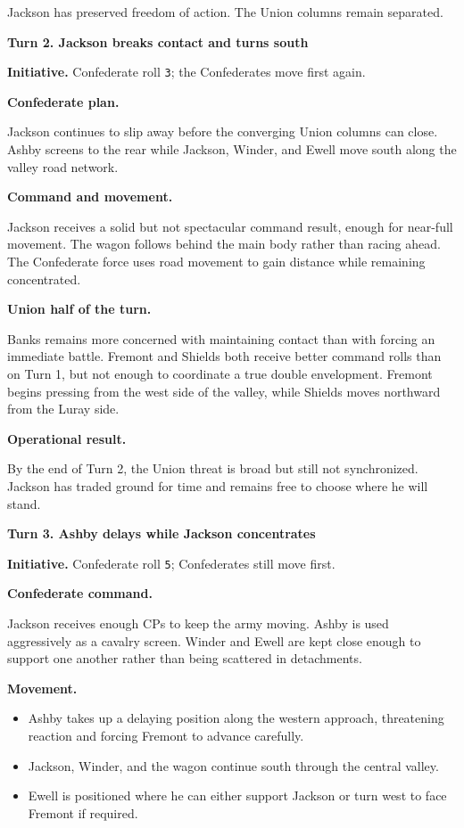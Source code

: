 \documentclass[11pt]{article}
\begin{document}
Jackson has preserved freedom of action. The Union columns remain separated.

\textbf{Turn 2. Jackson breaks contact and turns south}

\textbf{Initiative.} Confederate roll \texttt{3}; the Confederates move first again.

\textbf{Confederate plan.}

Jackson continues to slip away before the converging Union columns can close. Ashby screens to the rear while Jackson, Winder, and Ewell move south along the valley road network.

\textbf{Command and movement.}

Jackson receives a solid but not spectacular command result, enough for near-full movement. The wagon follows behind the main body rather than racing ahead. The Confederate force uses road movement to gain distance while remaining concentrated.

\textbf{Union half of the turn.}

Banks remains more concerned with maintaining contact than with forcing an immediate battle. Fremont and Shields both receive better command rolls than on Turn 1, but not enough to coordinate a true double envelopment. Fremont begins pressing from the west side of the valley, while Shields moves northward from the Luray side.

\textbf{Operational result.}

By the end of Turn 2, the Union threat is broad but still not synchronized. Jackson has traded ground for time and remains free to choose where he will stand.

\textbf{Turn 3. Ashby delays while Jackson concentrates}

\textbf{Initiative.} Confederate roll \texttt{5}; Confederates still move first.

\textbf{Confederate command.}

Jackson receives enough CPs to keep the army moving. Ashby is used aggressively as a cavalry screen. Winder and Ewell are kept close enough to support one another rather than being scattered in detachments.

\textbf{Movement.}

\begin{itemize}
\item Ashby takes up a delaying position along the western approach, threatening reaction and forcing Fremont to advance carefully.
\item Jackson, Winder, and the wagon continue south through the central valley.
\item Ewell is positioned where he can either support Jackson or turn west to face Fremont if required.
\end{itemize}
\end{document}
